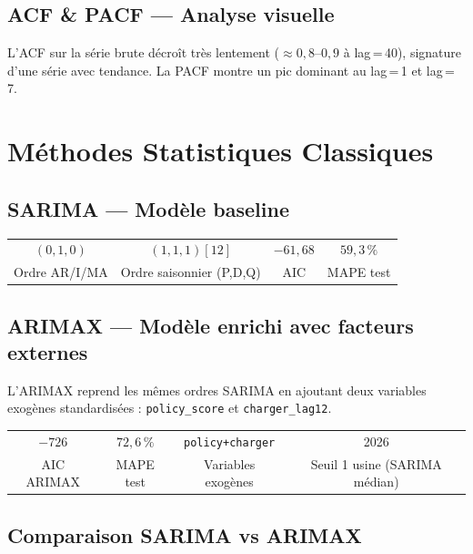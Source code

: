 \documentclass[12pt,a4paper]{article}
\begin{document}
\subsection{ACF \& PACF --- Analyse visuelle}

L'ACF sur la série brute décroît très lentement ($\approx 0{,}8$--$0{,}9$ à lag\,=\,40),
signature d'une série avec tendance. La PACF montre un pic dominant au lag\,=\,1 et lag\,=\,7.

\section{Méthodes Statistiques Classiques}

\subsection{SARIMA --- Modèle baseline}

\begin{formulebox}
\centering
\begin{tabular}{cccc}
$(0,1,0)$ & $(1,1,1)[12]$ & $-61{,}68$ & $59{,}3\,\%$ \\
Ordre AR/I/MA & Ordre saisonnier (P,D,Q) & AIC & MAPE test \\
\end{tabular}
\end{formulebox}

\subsection{ARIMAX --- Modèle enrichi avec facteurs externes}

L'ARIMAX reprend les mêmes ordres SARIMA en ajoutant deux variables exogènes
standardisées : \texttt{policy\_score} et \texttt{charger\_lag12}.

\begin{formulebox}
\centering
\begin{tabular}{cccc}
$-726$ & $72{,}6\,\%$ & \texttt{policy+charger} & 2026 \\
AIC ARIMAX & MAPE test & Variables exogènes & Seuil 1 usine (SARIMA médian) \\
\end{tabular}
\end{formulebox}

\subsection{Comparaison SARIMA vs ARIMAX}
\end{document}
